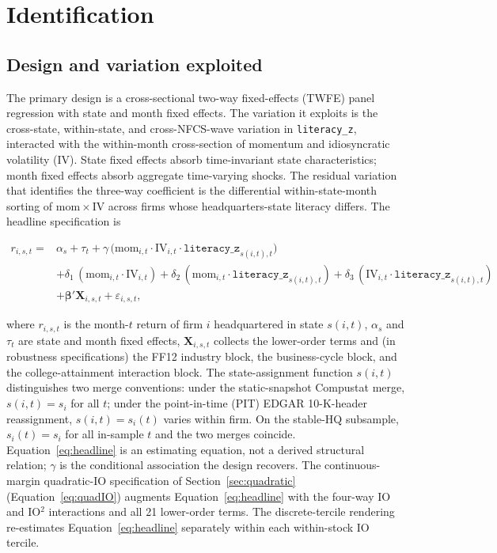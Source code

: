 \section{Identification}
\label{sec:identification}

\subsection{Design and variation exploited}

The primary design is a cross-sectional two-way fixed-effects (TWFE) panel regression with state and month fixed effects. The variation it exploits is the cross-state, within-state, and cross-NFCS-wave variation in \texttt{literacy\_z}, interacted with the within-month cross-section of momentum and idiosyncratic volatility (IV). State fixed effects absorb time-invariant state characteristics; month fixed effects absorb aggregate time-varying shocks. The residual variation that identifies the three-way coefficient is the differential within-state-month sorting of $\mathrm{mom}\times\mathrm{IV}$ across firms whose headquarters-state literacy differs. The headline specification is

\begin{equation}
\label{eq:headline}
\begin{split}
r_{i,s,t} = {}& \alpha_{s} + \tau_{t} + \gamma \,\bigl(\mathrm{mom}_{i,t}\cdot\mathrm{IV}_{i,t}\cdot\mathtt{literacy\_z}_{s(i,t),t}\bigr) \\
& + \delta_{1}\,(\mathrm{mom}_{i,t}\cdot\mathrm{IV}_{i,t}) + \delta_{2}\,(\mathrm{mom}_{i,t}\cdot\mathtt{literacy\_z}_{s(i,t),t}) + \delta_{3}\,(\mathrm{IV}_{i,t}\cdot\mathtt{literacy\_z}_{s(i,t),t}) \\
& + \boldsymbol{\beta}'\mathbf{X}_{i,s,t} + \varepsilon_{i,s,t},
\end{split}
\end{equation}

where $r_{i,s,t}$ is the month-$t$ return of firm $i$ headquartered in state $s(i,t)$, $\alpha_{s}$ and $\tau_{t}$ are state and month fixed effects, $\mathbf{X}_{i,s,t}$ collects the lower-order terms and (in robustness specifications) the FF12 industry block, the \citet{korniotisKumar2013} business-cycle block, and the college-attainment interaction block. The state-assignment function $s(i,t)$ distinguishes two merge conventions: under the static-snapshot Compustat merge, $s(i,t) = s_{i}$ for all $t$; under the point-in-time (PIT) EDGAR 10-K-header reassignment, $s(i,t) = s_{i}(t)$ varies within firm. On the stable-HQ subsample, $s_{i}(t) = s_{i}$ for all in-sample $t$ and the two merges coincide. Equation~\eqref{eq:headline} is an estimating equation, not a derived structural relation; $\gamma$ is the conditional association the design recovers. The continuous-margin quadratic-IO specification of Section~\ref{sec:quadratic} (Equation~\ref{eq:quadIO}) augments Equation~\eqref{eq:headline} with the four-way IO and IO$^{2}$ interactions and all 21 lower-order terms. The discrete-tercile rendering re-estimates Equation~\eqref{eq:headline} separately within each within-stock IO tercile.

